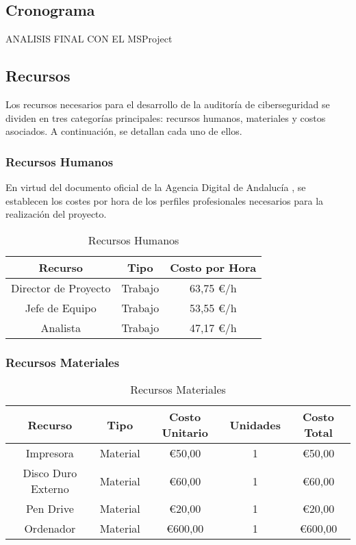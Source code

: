 \documentclass[a4paper, 10pt]{article}
\begin{document}
\subsection{Cronograma}
ANALISIS FINAL CON EL MSProject

\subsection{Recursos}

Los recursos necesarios para el desarrollo de la auditoría de ciberseguridad se dividen en tres categorías principales: recursos humanos, materiales y costos asociados. A continuación, se detallan cada uno de ellos.

\subsubsection{Recursos Humanos}

En virtud del documento oficial de la Agencia Digital de Andalucía \cite{agencia_digital}, se establecen los costes por hora de los perfiles profesionales necesarios para la realización del proyecto.

\begin{table}[H]
\centering
\renewcommand{\arraystretch}{1.5}
\begin{tabular}{|c|c|c|}
\hline
\textbf{Recurso} & \textbf{Tipo} & \textbf{Costo por Hora}  \\ \hline
Director de Proyecto & Trabajo & 63,75 €/h  \\ \hline
Jefe de Equipo & Trabajo & 53,55 €/h  \\ \hline
Analista & Trabajo & 47,17 €/h  \\ \hline
\end{tabular}
\caption{Recursos Humanos}
\label{tab:recursos_humanos}
\end{table}



\subsubsection{Recursos Materiales}
\begin{table}[H]
\centering
\renewcommand{\arraystretch}{1.5}
\begin{tabular}{|c|c|c|c|c|}
\hline
\textbf{Recurso} & \textbf{Tipo} & \textbf{Costo Unitario} & \textbf{Unidades} & \textbf{Costo Total}  \\ \hline
Impresora & Material & €50,00 & 1& €50,00  \\ \hline
Disco Duro Externo & Material &  €60,00 &1& €60,00  \\ \hline
Pen Drive & Material & €20,00 & 1& €20,00  \\ \hline
Ordenador & Material & €600,00 & 1& €600,00  \\ \hline
\end{tabular}
\caption{Recursos Materiales}
\label{tab:recursos_materiales}
\end{table}
\end{document}
